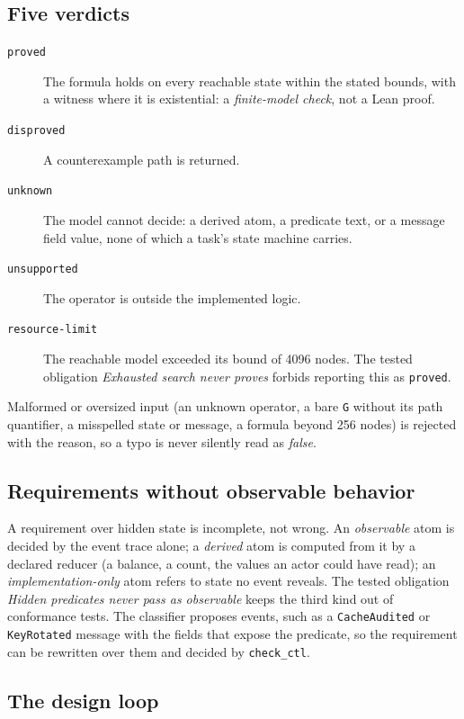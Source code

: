 \subsection{Five verdicts}

\begin{description}
\item[\texttt{proved}] The formula holds on every reachable state within the
stated bounds, with a witness where it is existential: a \emph{finite-model
check}, not a Lean proof.
\item[\texttt{disproved}] A counterexample path is returned.
\item[\texttt{unknown}] The model cannot decide: a derived atom, a predicate
text, or a message field value, none of which a task's state machine carries.
\item[\texttt{unsupported}] The operator is outside the implemented logic.
\item[\texttt{resource-limit}] The reachable model exceeded its bound of 4096
nodes. The tested obligation \emph{Exhausted search never proves} forbids
reporting this as \texttt{proved}.
\end{description}

Malformed or oversized input (an unknown operator, a bare \texttt{G} without its
path quantifier, a misspelled state or message, a formula beyond 256 nodes) is
rejected with the reason, so a typo is never silently read as \emph{false}.

\subsection{Requirements without observable behavior}

A requirement over hidden state is incomplete, not wrong. An \emph{observable}
atom is decided by the event trace alone; a \emph{derived} atom is computed from
it by a declared reducer (a balance, a count, the values an actor could have
read); an \emph{implementation-only} atom refers to state no event reveals. The
tested obligation \emph{Hidden predicates never pass as observable} keeps the
third kind out of conformance tests. The classifier proposes events, such as a
\texttt{CacheAudited} or \texttt{KeyRotated} message with the fields that expose
the predicate, so the requirement can be rewritten over them and decided by
\texttt{check\_ctl}.

\subsection{The design loop}


